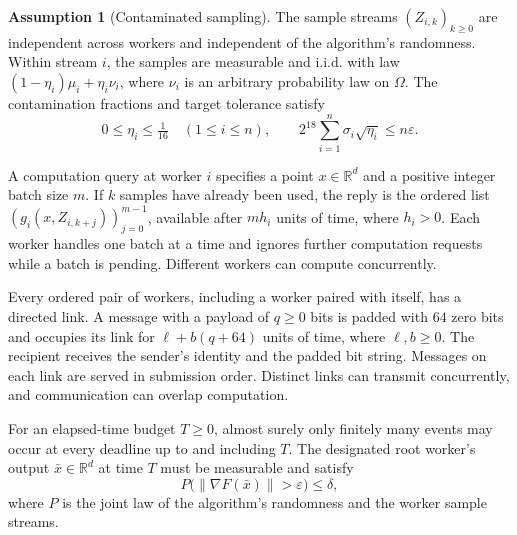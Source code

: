 \documentclass[10pt]{article}
\theoremstyle{definition}
\newtheorem{assumption}{Assumption}
\begin{document}
\begin{assumption}[Contaminated sampling]
The sample streams $(Z_{i,k})_{k\geq 0}$ are independent across workers and independent of the algorithm's randomness. Within stream $i$, the samples are measurable and i.i.d. with law $(1-\eta_i)\mu_i+\eta_i\nu_i$, where $\nu_i$ is an arbitrary probability law on $\Omega$. The contamination fractions and target tolerance satisfy
\[
0\leq\eta_i\leq\tfrac{1}{16}\quad (1\leq i\leq n),
\qquad
2^{18}\sum_{i=1}^n\sigma_i\sqrt{\eta_i}\leq n\varepsilon.
\]
\end{assumption}

A computation query at worker $i$ specifies a point $x\in\mathbb{R}^d$ and a positive integer batch size $m$. If $k$ samples have already been used, the reply is the ordered list $(g_i(x,Z_{i,k+j}))_{j=0}^{m-1}$, available after $m h_i$ units of time, where $h_i>0$. Each worker handles one batch at a time and ignores further computation requests while a batch is pending. Different workers can compute concurrently.

Every ordered pair of workers, including a worker paired with itself, has a directed link. A message with a payload of $q\geq 0$ bits is padded with $64$ zero bits and occupies its link for $\ell+b(q+64)$ units of time, where $\ell,b\geq 0$. The recipient receives the sender's identity and the padded bit string. Messages on each link are served in submission order. Distinct links can transmit concurrently, and communication can overlap computation.

For an elapsed-time budget $T\geq 0$, almost surely only finitely many events may occur at every deadline up to and including $T$. The designated root worker's output $\bar{x}\in\mathbb{R}^d$ at time $T$ must be measurable and satisfy
\[
P\bigl(\|\nabla F(\bar{x})\|>\varepsilon\bigr)\leq\delta,
\]
where $P$ is the joint law of the algorithm's randomness and the worker sample streams.
\end{document}
